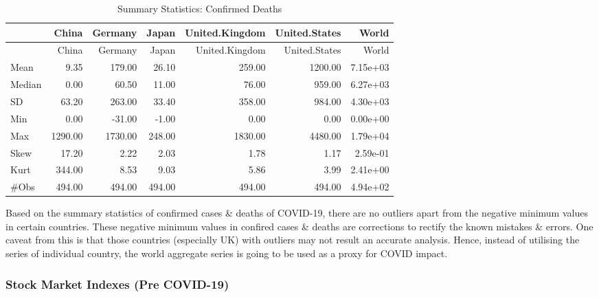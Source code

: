 \documentclass[
  11pt,
]{article}
\begin{document}
\begin{longtable}[]{@{}lrrrrrr@{}}
\caption{Summary Statistics: Confirmed Deaths}\tabularnewline
\toprule
& China & Germany & Japan & United.Kingdom & United.States & World \\
\midrule
\endfirsthead
\toprule
& China & Germany & Japan & United.Kingdom & United.States & World \\
\midrule
\endhead
Mean & 9.35 & 179.00 & 26.10 & 259.00 & 1200.00 & 7.15e+03 \\
Median & 0.00 & 60.50 & 11.00 & 76.00 & 959.00 & 6.27e+03 \\
SD & 63.20 & 263.00 & 33.40 & 358.00 & 984.00 & 4.30e+03 \\
Min & 0.00 & -31.00 & -1.00 & 0.00 & 0.00 & 0.00e+00 \\
Max & 1290.00 & 1730.00 & 248.00 & 1830.00 & 4480.00 & 1.79e+04 \\
Skew & 17.20 & 2.22 & 2.03 & 1.78 & 1.17 & 2.59e-01 \\
Kurt & 344.00 & 8.53 & 9.03 & 5.86 & 3.99 & 2.41e+00 \\
\#Obs & 494.00 & 494.00 & 494.00 & 494.00 & 494.00 & 4.94e+02 \\
\bottomrule
\end{longtable}

Based on the summary statistics of confirmed cases \& deaths of
COVID-19, there are no outliers apart from the negative minimum values
in certain countries. These negative minimum values in confired cases \&
deaths are corrections to rectify the known mistakes \& errors. One
caveat from this is that those countries (especially UK) with outliers
may not result an accurate analysis. Hence, instead of utilising the
series of individual country, the world aggregate series is going to be
used as a proxy for COVID impact.

\hypertarget{stock-market-indexes-pre-covid-19}{%
\subsubsection{Stock Market Indexes (Pre
COVID-19)}\label{stock-market-indexes-pre-covid-19}}
\end{document}
